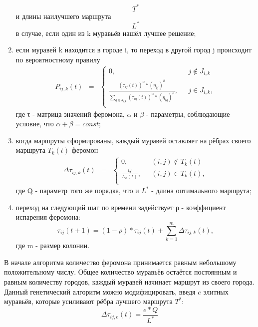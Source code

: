 \documentclass[12pt,a4paper]{scrartcl}
\begin{document}
\begin{enumerate}
\begin{equation}\label{eq2.6}
T^*
\end{equation}
и длины наилучшего маршрута
\begin{equation}\label{eq2.7}
L^*
\end{equation}
в случае, если один из k муравьёв нашёл лучшее решение;
\item если муравей k находится в городе i, то переход в другой город j происходит по вероятностному правилу
\begin{equation}\label{eq2.8}
\begin{matrix}
P_{ij,k}(t) & = 
& \left\{
\begin{matrix}
0, & \mbox{ } j \notin J_{i,k} \\
\frac {(τ_{ij}(t))^\alpha * (η_{ij})^\beta} {\sum \limits_{q \in J_{i,k}} (τ_{iq}(t))^\alpha * (η_{iq})^\beta}, & \mbox{ } j \in J_{i,k}, \\
\end{matrix} \right.
\end{matrix}
\end{equation}
где τ - матрица значений феромона, $\alpha$ и $\beta$ - параметры, соблюдающие условие, что $\alpha + \beta = const$;
\item когда маршруты сформированы, каждый муравей оставляет на рёбрах своего маршрута $T_k(t)$ феромон
\begin{equation}\label{eq2.9}
\begin{matrix}
\Delta τ_{ij,k}(t) & = 
& \left\{
\begin{matrix}
0, & \mbox{ } (i, j) \notin T_k(t) \\
\frac {Q} {L_k(t)}, & \mbox{ } (i, j) \in T_k(t), \\
\end{matrix} \right.
\end{matrix}
\end{equation}
где Q - параметр того же порядка, что и $L^*$ - длина оптимального маршрута;
\item переход на следующий шаг по времени задействует ρ - коэффициент испарения феромона:
\begin{equation}\label{eq2.10}
τ_{ij}(t+1) = (1-ρ) * τ_{ij}(t) + \sum \limits_{k=1}^m \Delta τ_{ij,k}(t),
\end{equation}
где m - размер колонии.
\end{enumerate}
\cite{RECA}

В начале алгоритма количество феромона принимается равным небольшому положительному числу. Общее количество муравьёв остаётся постоянным и равным количеству городов, каждый муравей начинает маршрут из своего города. Данный генетический алгоритм можно модифицировать, введя $e$ элитных муравьёв, которые усиливают рёбра лучшего маршрута $T^*$:
\begin{equation}\label{eq2.11}
\Delta τ_{ij,e}(t) = \frac {e * Q} {L^*}
\end{equation} \cite{RECA}
\end{document}
